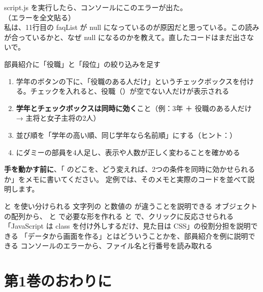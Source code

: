\begin{prompt}
script.js を実行したら、コンソールにこのエラーが出た。\\
（エラーを全文貼る）\\
私は、11行目の faqList が null になっているのが原因だと思っている。この読みが合っているかと、なぜ null になるのかを教えて。直したコードはまだ出さないで。
\end{prompt}



\begin{challenge}{部員紹介に「役職」と「段位」の絞り込みを足す}
\begin{enumerate}
  \item 学年のボタンの下に、「役職のある人だけ」というチェックボックスを付ける。チェックを入れると、役職（）が空でない人だけが表示される
  \item \textbf{学年とチェックボックスは同時に効く}こと（例：3年 ＋ 役職のある人だけ → 主将と女子主将の2人）
  \item 並び順を「学年の高い順、同じ学年なら名前順」にする（ヒント：）
  \item {} にダミーの部員を4人足し、表示や人数が正しく変わることを確かめる
\end{enumerate}
\textbf{手を動かす前に}、「 のどこを、どう変えれば、2つの条件を同時に効かせられるか」をメモに書いてください。
定例では、そのメモと実際のコードを並べて説明します。
\end{challenge}

\begin{checklist}
\begin{itemize}
  \checkitem {} と  を使い分けられる
  \checkitem 文字列の  と数値の  が違うことを説明できる
  \checkitem オブジェクトの配列から、 と  で必要な形を作れる
  \checkitem {} と  で、クリックに反応させられる
  \checkitem 「JavaScript は class を付け外しするだけ、見た目は CSS」の役割分担を説明できる
  \checkitem 「データから画面を作る」とはどういうことかを、部員紹介を例に説明できる
  \checkitem コンソールのエラーから、ファイル名と行番号を読み取れる
\end{itemize}
\end{checklist}

\section{第1巻のおわりに}

